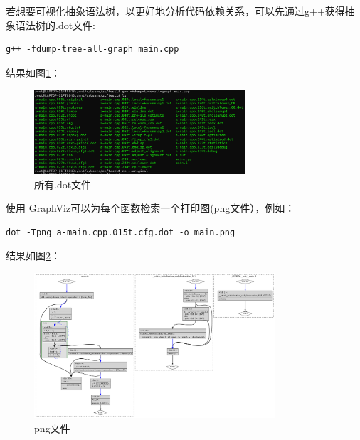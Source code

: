\documentclass[UTF8,a4paper,10pt]{ctexart}
\begin{document}
若想要可视化抽象语法树，以更好地分析代码依赖关系，可以先通过g++获得抽象语法树的.dot文件:
\begin{lstlisting}[frame=trbl]
  g++ -fdump-tree-all-graph main.cpp
\end{lstlisting}\par

结果如图\ref{fig:5}：
\begin{figure}[H]
    \centering
    \includegraphics[width=0.7\textwidth,height=0.7\textwidth]{imgs/dot文件.png}
    \caption{所有.dot文件}
    \label{fig:5}
\end{figure}


使用 GraphViz可以为每个函数检索一个打印图(png文件），例如：
\begin{lstlisting}[frame=trbl]
  dot -Tpng a-main.cpp.015t.cfg.dot -o main.png
\end{lstlisting}\par
结果如图\ref{fig:6}：
\begin{figure}[H]
    \centering
    \includegraphics[width=0.8\textwidth,height=0.8\textwidth]{imgs/main.png}
    \caption{png文件}
    \label{fig:6}
\end{figure}
\end{document}
